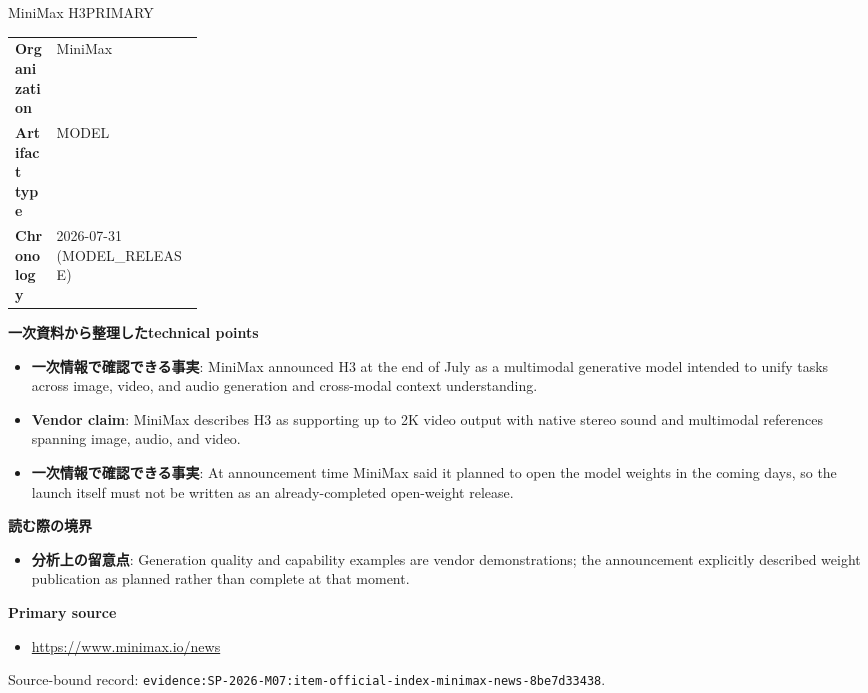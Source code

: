 \begin{technicalnote}{MiniMax H3}{PRIMARY}
\begin{tabularx}{\linewidth}{@{}>{\bfseries}p{0.22\linewidth}X@{}}
Organization & MiniMax \\
Artifact type & MODEL \\
Chronology & 2026-07-31 (MODEL\_RELEASE) \\
\end{tabularx}
\smallskip
{\bfseries 一次資料から整理したtechnical points}
\begin{itemize}[leftmargin=1.5em,itemsep=0.35em]
\item \textbf{一次情報で確認できる事実}: MiniMax announced H3 at the end of July as a multimodal generative model intended to unify tasks across image, video, and audio generation and cross-modal context understanding.
\item \textbf{Vendor claim}: MiniMax describes H3 as supporting up to 2K video output with native stereo sound and multimodal references spanning image, audio, and video.
\item \textbf{一次情報で確認できる事実}: At announcement time MiniMax said it planned to open the model weights in the coming days, so the launch itself must not be written as an already-completed open-weight release.
\end{itemize}
{\bfseries 読む際の境界}
\begin{itemize}[leftmargin=1.5em,itemsep=0.35em]
\item \textbf{分析上の留意点}: Generation quality and capability examples are vendor demonstrations; the announcement explicitly described weight publication as planned rather than complete at that moment.
\end{itemize}
{\bfseries Primary source}
\begin{itemize}[leftmargin=1.5em,itemsep=0.25em]
\item \url{https://www.minimax.io/news}
\end{itemize}
{\scriptsize\color{SurveyMuted}Source-bound record: \texttt{evidence:SP-2026-M07:item-official-index-minimax-news-8be7d33438}.}
\end{technicalnote}
\medskip

